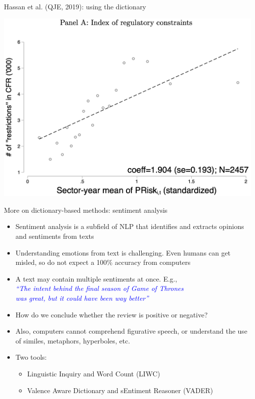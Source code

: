 \documentclass[english]{beamer}
\begin{document}
\begin{frame}{Hassan et al. (QJE, 2019): using the dictionary}
\vspace{-7pt}
\begin{center}
\includegraphics[scale=0.35]{Images/hassan_new4.png}
\end{center}
\end{frame}

\begin{frame}{More on dictionary-based methods: sentiment analysis}
\begin{itemize}
\setlength{\itemsep}{0.8em}
\item Sentiment analysis is a subfield of NLP that identifies and extracts opinions and sentiments from texts
\pause
\item Understanding emotions from text is challenging. Even humans can get misled, so do not expect a 100\% accuracy from computers
\item A text may contain multiple sentiments at once. E.g., \\
\vspace{2pt}
\textcolor{blue}{\textit{``The intent behind the final season of Game of Thrones\\
was great, but it could have been way better''}}
\item How do we conclude whether the review is positive or negative?
\item Also, computers cannot comprehend figurative speech, or understand the use of similes, metaphors, hyperboles, etc.
\pause
\item Two tools:
\vspace{4pt}
\begin{itemize}
\setlength{\itemsep}{0.3em}
\item Linguistic Inquiry and Word Count (LIWC)
\item Valence Aware Dictionary and sEntiment Reasoner (VADER)
\end{itemize}
\end{itemize}
\end{frame}
\end{document}
